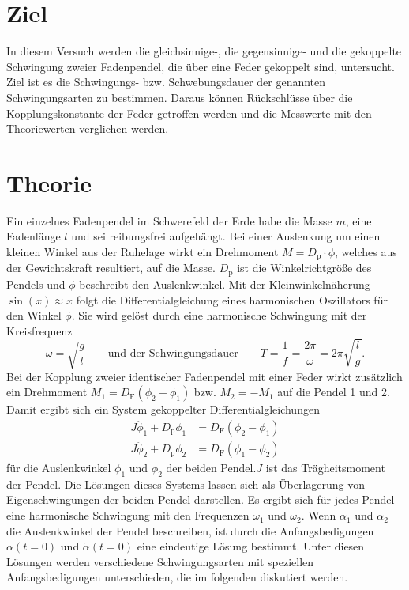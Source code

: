 \section{Ziel}
\label{sec:Ziel}
In diesem Versuch werden die gleichsinnige-, die gegensinnige- und die gekoppelte Schwingung zweier Fadenpendel, die über eine Feder gekoppelt sind, untersucht. 
Ziel ist es die Schwingungs- bzw. Schwebungsdauer der genannten Schwingungsarten zu bestimmen. Daraus können Rückschlüsse über die Kopplungskonstante der Feder getroffen werden
und die Messwerte mit den Theoriewerten verglichen werden.

\section{Theorie}
\label{sec:Theorie}
Ein einzelnes Fadenpendel im Schwerefeld der Erde habe die Masse $m$, eine Fadenlänge $l$ und sei reibungsfrei aufgehängt. Bei einer Auslenkung um einen kleinen Winkel aus der 
Ruhelage wirkt ein Drehmoment $M = D_{\text{p}} \cdot \phi$, welches aus der Gewichtskraft resultiert, auf die Masse. $D_{\text{p}}$ ist die Winkelrichtgröße des Pendels und $\phi$
beschreibt den Auslenkwinkel. Mit der Kleinwinkelnäherung $\sin(x) \approx x$ folgt die Differentialgleichung eines harmonischen Oszillators für den Winkel $\phi$. Sie wird
gelöst durch eine harmonische Schwingung mit der Kreisfrequenz
\begin{equation}
    \label{eqn:omega}
    \omega = \sqrt{\frac{g}{l}} \qquad \text{und der Schwingungsdauer} \qquad T = \frac{1}{f} = \frac{2\pi}{\omega} = 2\pi \sqrt{\frac{l}{g}} .
\end{equation} 
Bei der Kopplung zweier identischer Fadenpendel mit einer Feder wirkt zusätzlich ein Drehmoment $M_1 = D_{\text{F}} (\phi_2 - \phi_1)$ bzw. $M_2 = - M_1$ auf die Pendel 1 und 2. 
Damit ergibt sich ein System gekoppelter Differentialgleichungen
\begin{align*}
    J \ddot\phi_1 + D_{\text{p}} \phi_1 &= D_{\text{F}}(\phi_2 - \phi_1) \\
    J \ddot\phi_2 + D_{\text{p}} \phi_2 &= D_{\text{F}}(\phi_1 - \phi_2)
\end{align*}
für die Auslenkwinkel $\phi_1$ und $\phi_2$ der beiden Pendel.$J$ ist das Trägheitsmoment der Pendel. Die Lösungen dieses Systems lassen sich als Überlagerung von Eigenschwingungen der beiden
Pendel darstellen. Es ergibt sich für jedes Pendel eine harmonische Schwingung mit den Frequenzen $\omega_1$ und $\omega_2$. Wenn $\alpha_1$ und $\alpha_2$ die Auslenkwinkel der
Pendel beschreiben, ist durch die Anfangsbedigungen $\alpha(t = 0)$ und $\dot\alpha(t = 0)$ eine eindeutige Lösung bestimmt. Unter diesen Lösungen werden verschiedene Schwingungsarten
mit speziellen Anfangsbedigungen unterschieden, die im folgenden diskutiert werden.

